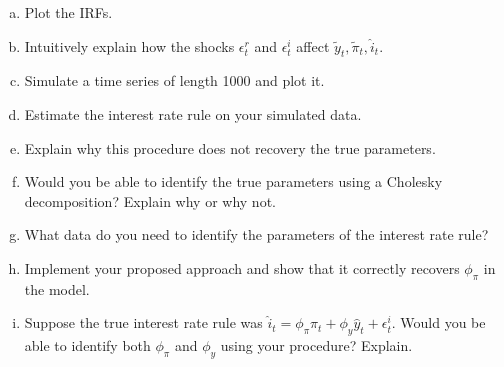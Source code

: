 \documentclass{article}
\newcommand{\1}{\mathbf{1}}
\begin{document}
\begin{enumerate}[(a)]
	\item Plot the IRFs. 
	\item Intuitively explain how the shocks $\epsilon^r_t$ and $\epsilon^i_t$ affect $\tilde{y}_t,\tilde{\pi}_t,\hat{i}_t$.
	\item Simulate a time series of length 1000 and plot it.
	\item Estimate the interest rate rule on your simulated data.
	\item Explain why this procedure does not recovery the true parameters.
	\item Would you be able to identify the true parameters using a Cholesky decomposition? Explain why or why not.
	\item What data do you need to identify the parameters of the interest rate rule?
	\item Implement your proposed approach and show that it correctly recovers $\phi_\pi$ in the model.
	\item Suppose the true interest rate rule was $\hat{i}_t= \phi_\pi\hat{\pi}_t + \phi_y\hat{y}_t + \epsilon^i_t$. Would you be able to identify both $\phi_\pi$ and $\phi_y$ using your procedure? Explain.

\end{enumerate}
\end{document}
